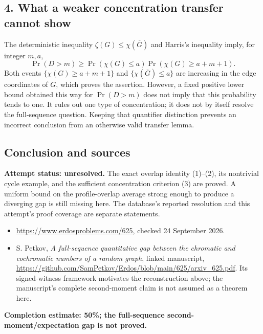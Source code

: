\subsection*{4. What a weaker concentration transfer cannot show}
The deterministic inequality $\zeta(G)\le\chi(\overline G)$ and Harris's inequality imply, for integer $m,a$,
\[
 \Pr(D>m)\ge\Pr(\chi(G)\le a)\Pr(\chi(G)\ge a+m+1).
\]
Both events $\{\chi(G)\ge a+m+1\}$ and $\{\chi(\overline G)\le a\}$ are increasing in the edge coordinates of $G$, which proves the assertion. However, a fixed positive lower bound obtained this way for $\Pr(D>m)$ does not imply that this probability tends to one. It rules out one type of concentration; it does not by itself resolve the full-sequence question. Keeping that quantifier distinction prevents an incorrect conclusion from an otherwise valid transfer lemma.

\subsection*{Conclusion and sources}
\textbf{Attempt status: unresolved.} The exact overlap identity (1)--(2), its nontrivial cycle example, and the sufficient concentration criterion (3) are proved. A uniform bound on the profile-overlap average strong enough to produce a diverging gap is still missing here. The database's reported resolution and this attempt's proof coverage are separate statements.
\begin{itemize}
\item \url{https://www.erdosproblems.com/625}, checked 24 September 2026.
\item S. Petkov, \emph{A full-sequence quantitative gap between the chromatic and cochromatic numbers of a random graph}, linked manuscript, \url{https://github.com/SamPetkov/Erdos/blob/main/625/arxiv_625.pdf}. Its signed-witness framework motivates the reconstruction above; the manuscript's complete second-moment claim is not assumed as a theorem here.
\end{itemize}
\noindent\textbf{Completion estimate: 50\%; the full-sequence second-moment/expectation gap is not proved.}
